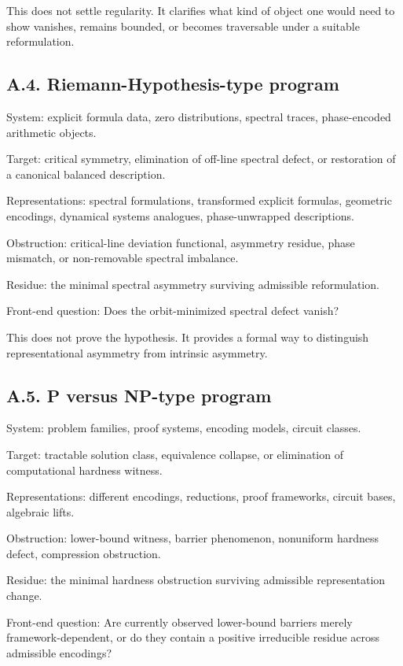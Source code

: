 \documentclass[
]{article}
\begin{document}
This does not settle regularity. It clarifies what kind of object one
would need to show vanishes, remains bounded, or becomes traversable
under a suitable reformulation.

\subsection{A.4. Riemann-Hypothesis-type
program}\label{a.4.-riemann-hypothesis-type-program}

System: explicit formula data, zero distributions, spectral traces,
phase-encoded arithmetic objects.

Target: critical symmetry, elimination of off-line spectral defect, or
restoration of a canonical balanced description.

Representations: spectral formulations, transformed explicit formulas,
geometric encodings, dynamical systems analogues, phase-unwrapped
descriptions.

Obstruction: critical-line deviation functional, asymmetry residue,
phase mismatch, or non-removable spectral imbalance.

Residue: the minimal spectral asymmetry surviving admissible
reformulation.

Front-end question: Does the orbit-minimized spectral defect vanish?

This does not prove the hypothesis. It provides a formal way to
distinguish representational asymmetry from intrinsic asymmetry.

\subsection{A.5. P versus NP-type
program}\label{a.5.-p-versus-np-type-program}

System: problem families, proof systems, encoding models, circuit
classes.

Target: tractable solution class, equivalence collapse, or elimination
of computational hardness witness.

Representations: different encodings, reductions, proof frameworks,
circuit bases, algebraic lifts.

Obstruction: lower-bound witness, barrier phenomenon, nonuniform
hardness defect, compression obstruction.

Residue: the minimal hardness obstruction surviving admissible
representation change.

Front-end question: Are currently observed lower-bound barriers merely
framework-dependent, or do they contain a positive irreducible residue
across admissible encodings?
\end{document}
